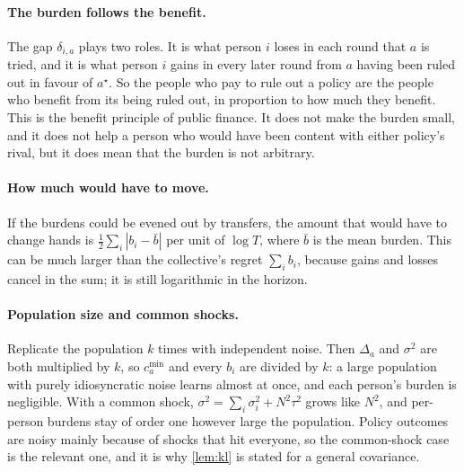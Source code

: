 \documentclass[11pt,a4paper]{article}
\theoremstyle{plain}
\theoremstyle{definition}
\theoremstyle{remark}
\newcommand{\cmin}{c^{\min}}
\newcommand{\astar}{a^\star}
\begin{document}
\paragraph{The burden follows the benefit.} The gap $\delta_{i,a}$ plays two roles. It is what person $i$ loses in each round that $a$ is tried, and it is what person $i$ gains in every later round from $a$ having been ruled out in favour of $\astar$. So the people who pay to rule out a policy are the people who benefit from its being ruled out, in proportion to how much they benefit. This is the benefit principle of public finance. It does not make the burden small, and it does not help a person who would have been content with either policy's rival, but it does mean that the burden is not arbitrary.

\paragraph{How much would have to move.} If the burdens could be evened out by transfers, the amount that would have to change hands is $\tfrac12\sum_i|b_i-\bar b|$ per unit of $\log T$, where $\bar b$ is the mean burden. This can be much larger than the collective's regret $\sum_ib_i$, because gains and losses cancel in the sum; it is still logarithmic in the horizon.

\paragraph{Population size and common shocks.} Replicate the population $k$ times with independent noise. Then $\Delta_a$ and $\sigma^2$ are both multiplied by $k$, so $\cmin_a$ and every $b_i$ are divided by $k$: a large population with purely idiosyncratic noise learns almost at once, and each person's burden is negligible. With a common shock, $\sigma^2=\sum_i\sigma_i^2+N^2\tau^2$ grows like $N^2$, and per-person burdens stay of order one however large the population. Policy outcomes are noisy mainly because of shocks that hit everyone, so the common-shock case is the relevant one, and it is why \cref{lem:kl} is stated for a general covariance.
\end{document}
